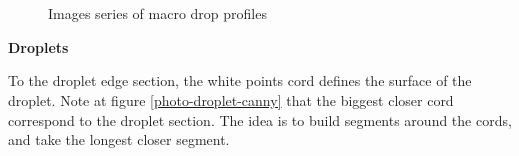 \documentclass[12pt]{iopart}
\begin{document}
\begin{figure}[h!]
\begin{center}    
\\
\\
\end{center}
\caption{{\small Images series of macro drop profiles}}
\label{fig::photo-results-macro-drop}
\end{figure}
               
\textbf{Droplets}

To the droplet edge section, the white points cord defines 
the surface of the droplet. Note at figure \ref{photo-droplet-canny} that the biggest closer
 cord correspond to the droplet section. The idea is to build segments around
 the cords, and take the longest closer segment. 
                
\end{document}
